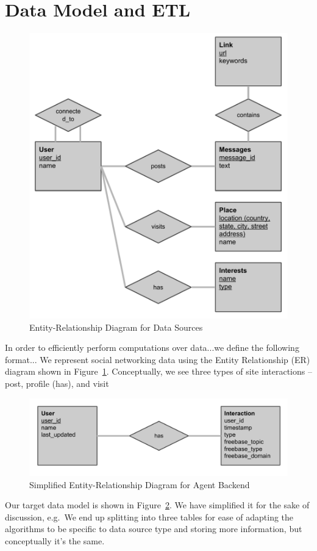 \section{Data Model and ETL}
\label{sec:data}

\begin{figure}[!h]
\begin{center}
\includegraphics[width=0.5\linewidth]{figs/er-datasource.pdf}
\caption{Entity-Relationship Diagram for Data Sources}
\label{fig:er-datasource}
\end{center}
\end{figure}

In order to efficiently perform computations over data...we define the following
format...
We represent social networking data using the Entity Relationship (ER) diagram
shown in Figure~\ref{fig:er-datasource}.
Conceptually, we see three types of site interactions -- post, profile (has),
and visit

\begin{figure}[!h]
\begin{center}
\includegraphics[width=0.5\linewidth]{figs/er-agent.pdf}
\caption{Simplified Entity-Relationship Diagram for Agent Backend}
\label{fig:er-agent}
\end{center}
\end{figure}

Our target data model is shown in Figure~\ref{fig:er-agent}.
We have simplified it for the sake of discussion, 
e.g.\ We end up splitting into three tables for ease of adapting the algorithms to be
specific to data source type and
storing more information, but conceptually it's the same.
